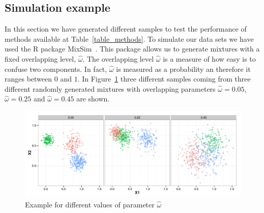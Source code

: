 \documentclass[10pt, a4paper]{article}
\begin{document}
\subsection{Simulation example}

In this section we have generated different samples to test the performance of methods available at Table~\ref{table_methods}. To simulate our data sets we have used the R package MixSim~\citep{Citar mixxim}. This package allows us to generate mixtures with a fixed overlapping level, $\hat{\omega}$. The overlapping level $\hat{\omega}$ is a measure of how easy is to confuse two components. In fact,  $\hat{\omega}$ is measured as a probability an therefore it ranges between $0$ and $1$. In Figure~\ref{omega} three different samples coming from three different randomly generated mixtures with overlapping parameters  $\hat{\omega}=0.05$, $\hat{\omega}=0.25$ and $\hat{\omega}=0.45$ are shown.

\begin{figure}[!t]
\centering
\includegraphics[scale=.5]{omega.pdf}
\caption{Example for different values of parameter $\hat{\omega}$}
\label{omega}
\end{figure}
\end{document}
